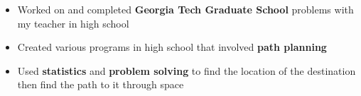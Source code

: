 \documentclass[12pt,letterpaper]{altacv}
\begin{document}

\divider 

\begin{itemize}
    \item Worked on and completed \textbf{Georgia Tech Graduate School} problems with my teacher in high school
    \item Created various programs in high school that involved \textbf{path planning}
    \item Used \textbf{statistics} and \textbf{problem solving} to find the location of the destination then find the path to it through space
\end{itemize}

\smallskip







\clearpage
\end{document}
